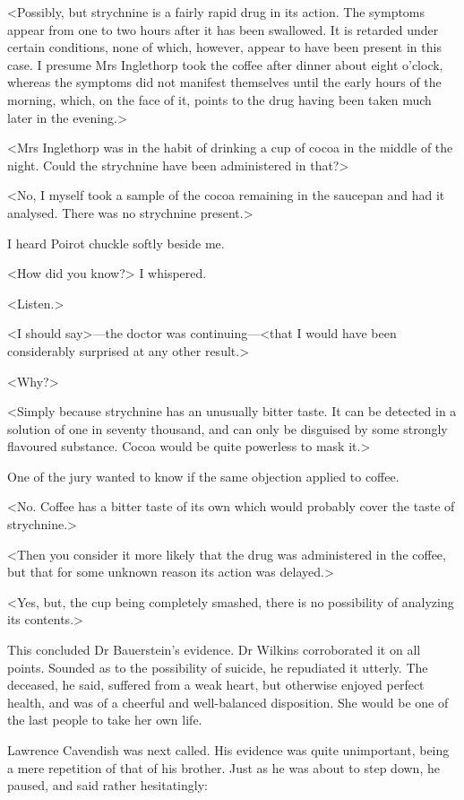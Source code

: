  <Possibly, but strychnine is a fairly rapid drug in its action. The symptoms appear from one to two hours after it has been swallowed. It is retarded under certain conditions, none of which, however, appear to have been present in this case. I presume Mrs Inglethorp took the coffee after dinner about eight o'clock, whereas the symptoms did not manifest themselves until the early hours of the morning, which, on the face of it, points to the drug having been taken much later in the evening.> 

 <Mrs Inglethorp was in the habit of drinking a cup of cocoa in the middle of the night. Could the strychnine have been administered in that?> 

 <No, I myself took a sample of the cocoa remaining in the saucepan and had it analysed. There was no strychnine present.> 

 I heard Poirot chuckle softly beside me. 

 <How did you know?> I whispered. 

 <Listen.> 

 <I should say>—the doctor was continuing—<that I would have been considerably surprised at any other result.> 

 <Why?> 

 <Simply because strychnine has an unusually bitter taste. It can be detected in a solution of one in seventy thousand, and can only be disguised by some strongly flavoured substance. Cocoa would be quite powerless to mask it.> 

 One of the jury wanted to know if the same objection applied to coffee. 

 <No. Coffee has a bitter taste of its own which would probably cover the taste of strychnine.> 

 <Then you consider it more likely that the drug was administered in the coffee, but that for some unknown reason its action was delayed.> 

 <Yes, but, the cup being completely smashed, there is no possibility of analyzing its contents.> 

 This concluded Dr Bauerstein's evidence. Dr Wilkins corroborated it on all points. Sounded as to the possibility of suicide, he repudiated it utterly. The deceased, he said, suffered from a weak heart, but otherwise enjoyed perfect health, and was of a cheerful and well-balanced disposition. She would be one of the last people to take her own life. 

 Lawrence Cavendish was next called. His evidence was quite unimportant, being a mere repetition of that of his brother. Just as he was about to step down, he paused, and said rather hesitatingly: 

